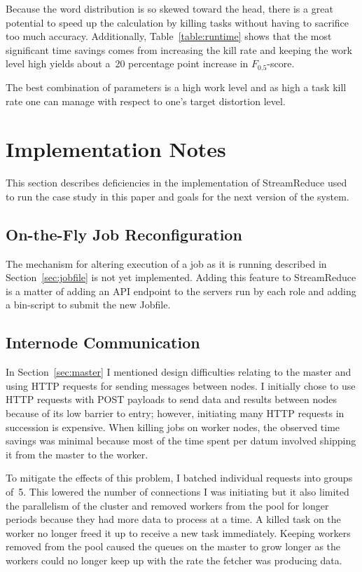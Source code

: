 \documentclass[12pt,twocolumn]{article}
\begin{document}
Because the word distribution is so skewed toward the head, there is a great potential to
speed up the calculation by killing tasks without having to sacrifice too much accuracy.
Additionally, Table~\ref{table:runtime} shows that the most significant time savings comes
from increasing the kill rate and keeping the work level high yields about a~20 percentage
point
increase in $F_{0.5}$-score.

The best combination of parameters is a high work level and as high a task kill rate one can
manage with respect to one's target distortion level.


\section{Implementation Notes}
\label{sec:discussion}
This section describes deficiencies in the implementation of StreamReduce used to run the
case study
in this paper and goals for the next version of the system.

\subsection{On-the-Fly Job Reconfiguration}
The mechanism for altering execution of a job as it is running described in
Section~\ref{sec:jobfile}
is not yet implemented. Adding this feature to StreamReduce is a matter of adding an API
endpoint
to the servers run by each role and adding a bin-script to submit the new Jobfile.

\subsection{Internode Communication}
In Section~\ref{sec:master} I mentioned design difficulties relating to the master and using
HTTP
requests for sending messages between nodes. I initially chose to use HTTP requests with
POST payloads
to send data and results between nodes because of its low barrier to entry; however,
initiating many
HTTP requests in succession is expensive. When killing jobs on worker nodes, the observed
time savings
was minimal because most of the time spent per datum involved shipping it from the master
to the worker.

To mitigate the effects of this problem, I batched individual requests into groups of~5. This
lowered the number of connections I was initiating but it also limited the parallelism of the
cluster
and removed workers from the pool for longer periods because they had more data to
process at a time.
A killed task on the worker no longer freed it up to receive a new task immediately.
Keeping workers removed from the pool caused the queues on the master to grow longer as
the workers
could no longer keep up with the rate the fetcher was producing data.
\end{document}
